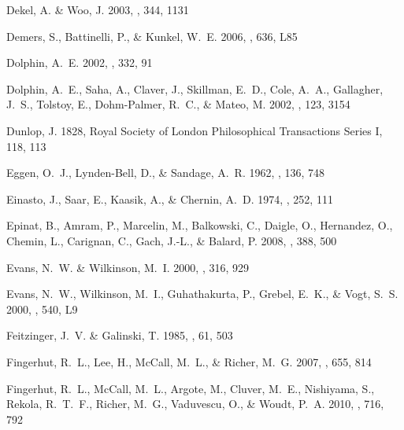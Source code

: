 \documentclass[manuscript]{aastex}
\begin{document}
\begin{thebibliography}{381}
{Dekel}, A. \& {Woo}, J. 2003, \mnras, 344, 1131

{Demers}, S., {Battinelli}, P., \& {Kunkel}, W.~E. 2006, \apjl, 636, L85

{Dolphin}, A.~E. 2002, \mnras, 332, 91

{Dolphin}, A.~E., {Saha}, A., {Claver}, J., {Skillman}, E.~D., {Cole}, A.~A.,
  {Gallagher}, J.~S., {Tolstoy}, E., {Dohm-Palmer}, R.~C., \& {Mateo}, M. 2002,
  \aj, 123, 3154

{Dunlop}, J. 1828, Royal Society of London Philosophical Transactions Series I,
  118, 113

{Eggen}, O.~J., {Lynden-Bell}, D., \& {Sandage}, A.~R. 1962, \apj, 136, 748

{Einasto}, J., {Saar}, E., {Kaasik}, A., \& {Chernin}, A.~D. 1974, \nat, 252,
  111

{Epinat}, B., {Amram}, P., {Marcelin}, M., {Balkowski}, C., {Daigle}, O.,
  {Hernandez}, O., {Chemin}, L., {Carignan}, C., {Gach}, J.-L., \& {Balard}, P.
  2008, \mnras, 388, 500

{Evans}, N.~W. \& {Wilkinson}, M.~I. 2000, \mnras, 316, 929

{Evans}, N.~W., {Wilkinson}, M.~I., {Guhathakurta}, P., {Grebel}, E.~K., \&
  {Vogt}, S.~S. 2000, \apjl, 540, L9

{Feitzinger}, J.~V. \& {Galinski}, T. 1985, \aaps, 61, 503

{Fingerhut}, R.~L., {Lee}, H., {McCall}, M.~L., \& {Richer}, M.~G. 2007, \apj,
  655, 814

{Fingerhut}, R.~L., {McCall}, M.~L., {Argote}, M., {Cluver}, M.~E.,
  {Nishiyama}, S., {Rekola}, R.~T.~F., {Richer}, M.~G., {Vaduvescu}, O., \&
  {Woudt}, P.~A. 2010, \apj, 716, 792


\end{thebibliography}
\end{document}
